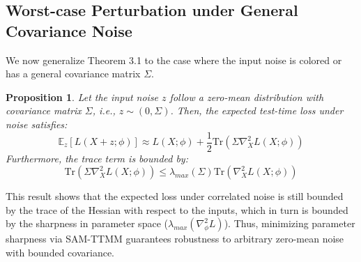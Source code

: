 \documentclass{article}
\theoremstyle{plain}
\newtheorem{proposition}[theorem]{Proposition}
\theoremstyle{definition}
\theoremstyle{remark}
\begin{document}
\subsection{Worst-case Perturbation under General Covariance Noise}
We now generalize Theorem 3.1 to the case where the input noise is colored or has a general covariance matrix $\Sigma$.
\begin{proposition}
Let the input noise $z$ follow a zero-mean distribution with covariance matrix $\Sigma$, i.e., $z \sim (0, \Sigma)$. Then, the expected test-time loss under noise satisfies:
\begin{equation}
    \mathbb{E}_z [ L(X+z; \phi) ] \approx L(X; \phi) + \frac{1}{2} \text{Tr}\left( \Sigma \nabla_X^2 L(X; \phi) \right)
\end{equation}
Furthermore, the trace term is bounded by:
\begin{equation}
    \text{Tr}\left( \Sigma \nabla_X^2 L(X; \phi) \right) \le \lambda_{max}(\Sigma) \text{Tr}\left( \nabla_X^2 L(X; \phi) \right)
\end{equation}
\end{proposition}
This result shows that the expected loss under correlated noise is still bounded by the trace of the Hessian with respect to the inputs, which in turn is bounded by the sharpness in parameter space ($\lambda_{max}(\nabla^2_\phi L)$). Thus, minimizing parameter sharpness via SAM-TTMM guarantees robustness to arbitrary zero-mean noise with bounded covariance.
\end{document}
